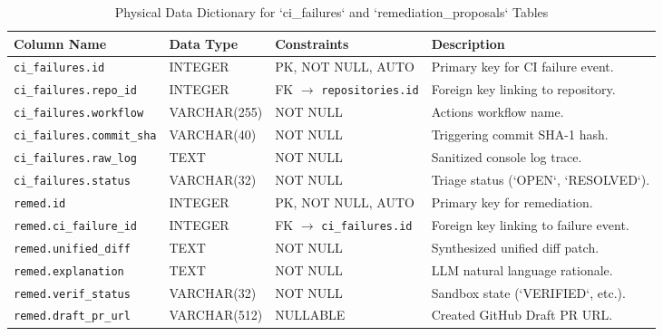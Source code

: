 \begin{table}[htbp]
    \centering
    \caption{Physical Data Dictionary for `ci\_failures` and `remediation\_proposals` Tables}
    \label{tab:app-dict-ci}
    \small
    \begin{tabularx}{\textwidth}{p{} p{} p{} p{}}
        \toprule
        \textbf{Column Name} & \textbf{Data Type} & \textbf{Constraints} & \textbf{Description} \\
        \midrule
        \texttt{ci\_failures.id} & INTEGER & PK, NOT NULL, AUTO & Primary key for CI failure event. \\
        \texttt{ci\_failures.repo\_id} & INTEGER & FK $\to$ \texttt{repositories.id} & Foreign key linking to repository. \\
        \texttt{ci\_failures.workflow} & VARCHAR(255) & NOT NULL & Actions workflow name. \\
        \texttt{ci\_failures.commit\_sha} & VARCHAR(40) & NOT NULL & Triggering commit SHA-1 hash. \\
        \texttt{ci\_failures.raw\_log} & TEXT & NOT NULL & Sanitized console log trace. \\
        \texttt{ci\_failures.status} & VARCHAR(32) & NOT NULL & Triage status (`OPEN`, `RESOLVED`). \\
        \midrule
        \texttt{remed.id} & INTEGER & PK, NOT NULL, AUTO & Primary key for remediation. \\
        \texttt{remed.ci\_failure\_id} & INTEGER & FK $\to$ \texttt{ci\_failures.id} & Foreign key linking to failure event. \\
        \texttt{remed.unified\_diff} & TEXT & NOT NULL & Synthesized unified diff patch. \\
        \texttt{remed.explanation} & TEXT & NOT NULL & LLM natural language rationale. \\
        \texttt{remed.verif\_status} & VARCHAR(32) & NOT NULL & Sandbox state (`VERIFIED`, etc.). \\
        \texttt{remed.draft\_pr\_url} & VARCHAR(512) & NULLABLE & Created GitHub Draft PR URL. \\
        \bottomrule
    \end{tabularx}
\end{table}

